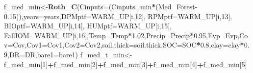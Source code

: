 \documentclass[
  10pt,
  b5paper,
]{book}
\newenvironment{Shaded}{\begin{snugshade}}{\end{snugshade}}
\newcommand{\DataTypeTok}[1]{\textcolor[rgb]{0.13,0.29,0.53}{#1}}
\newcommand{\DecValTok}[1]{\textcolor[rgb]{0.00,0.00,0.81}{#1}}
\newcommand{\FloatTok}[1]{\textcolor[rgb]{0.00,0.00,0.81}{#1}}
\newcommand{\KeywordTok}[1]{\textcolor[rgb]{0.13,0.29,0.53}{\textbf{#1}}}
\newcommand{\NormalTok}[1]{#1}
\newcommand{\OperatorTok}[1]{\textcolor[rgb]{0.81,0.36,0.00}{\textbf{#1}}}
\begin{document}
\begin{Shaded}
\begin{Highlighting}[]
\NormalTok{f_med_min<-}\KeywordTok{Roth_C}\NormalTok{(}\DataTypeTok{Cinputs=}\NormalTok{(Cinputs_min}\OperatorTok{*}\NormalTok{(Med_Forest}\FloatTok{-0.15}\NormalTok{)),}\DataTypeTok{years=}\NormalTok{years,}\DataTypeTok{DPMptf=}\NormalTok{WARM_UP[i,}\DecValTok{12}\NormalTok{], }\DataTypeTok{RPMptf=}\NormalTok{WARM_UP[i,}\DecValTok{13}\NormalTok{], }\DataTypeTok{BIOptf=}\NormalTok{WARM_UP[i,}\DecValTok{14}\NormalTok{], }\DataTypeTok{HUMptf=}\NormalTok{WARM_UP[i,}\DecValTok{15}\NormalTok{], }\DataTypeTok{FallIOM=}\NormalTok{WARM_UP[i,}\DecValTok{16}\NormalTok{],}\DataTypeTok{Temp=}\NormalTok{Temp}\OperatorTok{*}\FloatTok{1.02}\NormalTok{,}\DataTypeTok{Precip=}\NormalTok{Precip}\OperatorTok{*}\FloatTok{0.95}\NormalTok{,}\DataTypeTok{Evp=}\NormalTok{Evp,}\DataTypeTok{Cov=}\NormalTok{Cov,}\DataTypeTok{Cov1=}\NormalTok{Cov1,}\DataTypeTok{Cov2=}\NormalTok{Cov2,}\DataTypeTok{soil.thick=}\NormalTok{soil.thick,}\DataTypeTok{SOC=}\NormalTok{SOC}\OperatorTok{*}\FloatTok{0.8}\NormalTok{,}\DataTypeTok{clay=}\NormalTok{clay}\OperatorTok{*}\FloatTok{0.9}\NormalTok{,}\DataTypeTok{DR=}\NormalTok{DR,}\DataTypeTok{bare1=}\NormalTok{bare1)}
\NormalTok{f_med_t_min<-f_med_min[}\DecValTok{1}\NormalTok{]}\OperatorTok{+}\NormalTok{f_med_min[}\DecValTok{2}\NormalTok{]}\OperatorTok{+}\NormalTok{f_med_min[}\DecValTok{3}\NormalTok{]}\OperatorTok{+}\NormalTok{f_med_min[}\DecValTok{4}\NormalTok{]}\OperatorTok{+}\NormalTok{f_med_min[}\DecValTok{5}\NormalTok{]}


\end{Highlighting}
\end{Shaded}
\end{document}
